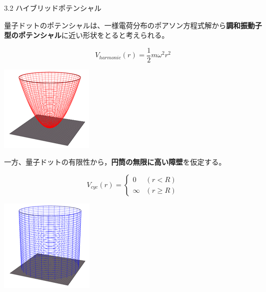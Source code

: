 \documentclass{beamer}
\begin{document}
\begin{frame}{3.2 ハイブリッドポテンシャル}

  量子ドットのポテンシャルは、一様電荷分布のポアソン方程式解から\textbf{調和振動子型のポテンシャル}に近い形状をとると考えられる。
  
  \vspace{0.5em}
  \begin{minipage}{0.7\textwidth}
  \begin{equation}
  V_{harmonic}(r)=\frac{1}{2}m\omega^2r^2
  \end{equation}
  \end{minipage}
  \hfill
  \begin{minipage}{0.25\textwidth}
  \includegraphics[width=0.5\linewidth]{images/調和.png} \\
  \end{minipage}
  
  一方、量子ドットの有限性から，\textbf{円筒の無限に高い障壁}を仮定する。
  
  \vspace{0.5em}
  \begin{minipage}{0.7\textwidth}
  \begin{equation}
  V_{cyc}(r) =
  \begin{cases}
  0 & (r < R) \\
  \infty & (r \geq R)
  \end{cases}
  \end{equation}
  \end{minipage}
  \hfill
  \begin{minipage}{0.25\textwidth}
  \includegraphics[width=0.5\linewidth]{images/円筒.png} \\
  \end{minipage}
  

\end{frame}
\end{document}
